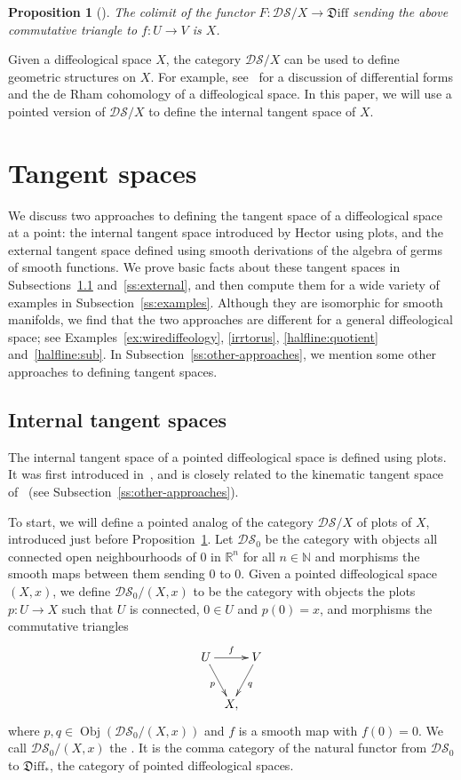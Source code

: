 \documentclass{amsart}
\newcommand{\dfn}[1]{\textbf{\boldmath{#1}}}
\newtheorem{prop}[de]{Proposition}
\theoremstyle{remark}
\newcommand{\ra}{\to}
\DeclareMathOperator{\obj}{Obj}
\newcommand{\Diff}{{\mathfrak{D}\mathrm{iff}}}
\newcommand{\DS}{{\mathcal{DS}}}
\def \N{\mathbb{N}}
\def \R{\mathbb{R}}
\begin{document}
\begin{prop}[{\cite[Proposition~2.7]{CSW}}]\label{colim}
The colimit of the functor $F:\DS/X \ra \Diff$
sending the above commutative triangle to $f:U \ra V$ is $X$.
\end{prop}

Given a diffeological space $X$, the category $\DS/X$ can be used to define
geometric structures on $X$.
For example, see~\cite{I3} for a discussion of differential forms and the
de Rham cohomology of a diffeological space.
In this paper, we will use a pointed version of $\DS/X$ to
define the internal tangent space of $X$.

\section{Tangent spaces}

We discuss two approaches to defining the tangent space of a diffeological space at a point:
the internal tangent space introduced by Hector using plots,
and the external tangent space defined using smooth derivations of the
algebra of germs of smooth functions.
We prove basic facts about these tangent spaces in Subsections~\ref{ss:internal}
and~\ref{ss:external}, and then compute them for a wide variety of examples
in Subsection~\ref{ss:examples}.
Although they are isomorphic for smooth manifolds,
we find that the two approaches are different for a general diffeological space;
see Examples~\ref{ex:wirediffeology}, \ref{irrtorus},
\ref{halfline:quotient} and~\ref{halfline:sub}.
In Subsection~\ref{ss:other-approaches}, we mention some other
approaches to defining tangent spaces.

\subsection{Internal tangent spaces}\label{ss:internal}

The internal tangent space of a pointed diffeological space is defined using plots.
It was first introduced in~\cite{He},
and is closely related to the kinematic tangent space of~\cite{KM}
(see Subsection~\ref{ss:other-approaches}).

\medskip

To start, we will define a pointed analog of the category $\DS/X$ of plots
of $X$, introduced just before Proposition~\ref{colim}.
Let $\DS_0$ be the category with
objects all connected open neighbourhoods of $0$ in $\R^n$ for all $n \in \N$
and morphisms the smooth maps between them sending $0$ to $0$.
Given a pointed diffeological space $(X,x)$,
we define $\DS_0/(X,x)$ to be the category
with objects the plots $p:U \ra X$ such that $U$ is connected, $0 \in U$ and $p(0)=x$,
and morphisms the commutative triangles
\[
\xymatrix@C5pt{U \ar[dr]_p \ar[rr]^f & & V \ar[dl]^q \\ & X , }
\]
where $p,q \in \obj(\DS_0/(X,x))$ and $f$ is a smooth map with $f(0)=0$.
We call $\DS_0/(X,x)$ the \dfn{category of plots of $X$ centered at $x$}.
It is the comma category of the natural functor from $\DS_0$ to
$\Diff_{*}$, the category of pointed diffeological spaces.
\end{document}
